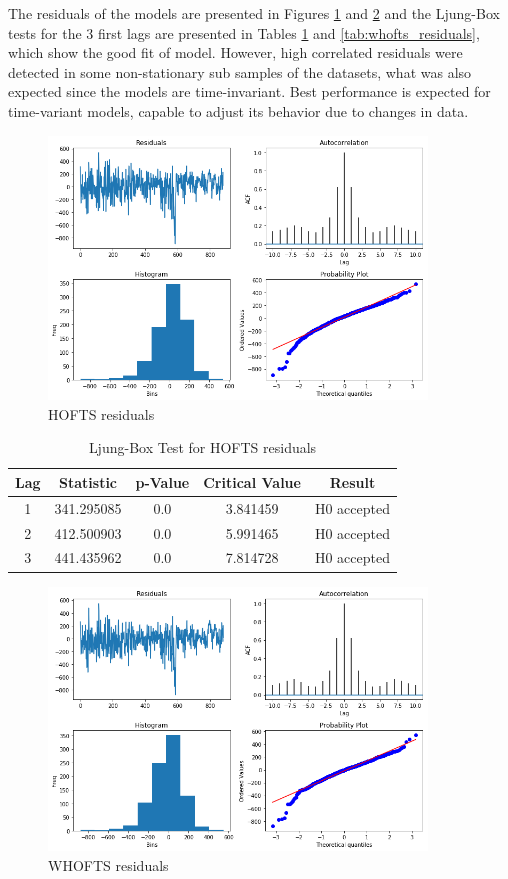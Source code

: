 The residuals of the models are presented in Figures \ref{fig:hofts_residual} and \ref{fig:whofts_residual} and the Ljung-Box tests for the 3 first lags are presented in Tables \ref{tab:hofts_residuals} and \ref{tab:whofts_residuals}, which show the good fit of model. However, high correlated residuals were detected in some non-stationary sub samples of the datasets, what was also expected since the models are time-invariant. Best performance is expected for time-variant models, capable to adjust its behavior due to changes in data.

\begin{figure}[htb]
    \centering
    \includegraphics[width=\textwidth,height=7cm]{figures/hofts_residual.png}
    \caption{HOFTS residuals}
    \label{fig:hofts_residual}
\end{figure}

\begin{table}[htb]
    \centering
    \begin{tabular}{|c|c|c|c|c|}
\hline
Lag &   Statistic &  p-Value &  Critical Value &       Result \\ \hline
1 &  341.295085 &      0.0 &        3.841459 &  H0 accepted \\ \hline
2 &  412.500903 &      0.0 &        5.991465 &  H0 accepted \\ \hline
3 &  441.435962 &      0.0 &        7.814728 &  H0 accepted \\ \hline
\end{tabular}
    \caption{Ljung-Box Test for HOFTS residuals}
    \label{tab:hofts_residuals}
\end{table}

\begin{figure}[htb]
    \centering
    \includegraphics[width=\textwidth,height=7cm]{figures/whofts_residual.png}
    \caption{WHOFTS residuals}
    \label{fig:whofts_residual}
\end{figure}

